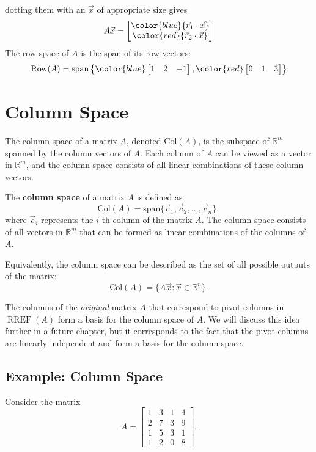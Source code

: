 dotting them with an $\vec{x}$ of appropriate size gives
\[A\vec{x} =
\begin{bmatrix}
\color{blue}{\vec r_1 \cdot \vec{x}} \\
\color{red}{\vec r_2 \cdot \vec{x}}
\end{bmatrix} 
\]
The row space of $A$ is the span of its row vectors:
\[\text{Row}(A)
=
\text{span}\left\{
\color{blue}\begin{bmatrix}1 & 2 & -1\end{bmatrix},
\color{red}\begin{bmatrix}0 & 1 & 3\end{bmatrix}
\right\}
\]


\section{Column Space}
The column space of a matrix $A$, denoted $\text{Col}(A)$, is the subspace of $\mathbb{R}^m$ spanned by the column vectors of $A$. Each column of $A$ can be viewed as a vector in $\mathbb{R}^m$, and the column space consists of all linear combinations of these column vectors.

\begin{mdframed}[frametitle = {Column Space}, style = important]
The \textbf{column space} of a matrix $A$ is defined as
\[
\text{Col}(A) = \text{span}\{\vec c_1, \vec c_2, \ldots, \vec c_n\},
\]
where $\vec c_i$ represents the $i$-th column of the matrix $A$.
The column space consists of all vectors in $\mathbb{R}^m$ that can be formed as linear combinations of the columns of $A$.
\end{mdframed}

Equivalently, the column space can be described as the set of all possible outputs of the matrix:
\[
\text{Col}(A) = \{A\vec{x} : \vec{x} \in \mathbb{R}^n\}.
\]

The columns of the \emph{original} matrix $A$ that correspond to pivot columns in $\operatorname{RREF}(A)$ form a basis for the column space of $A$. We will discuss this idea further in a future chapter, but it corresponds to the fact that the pivot columns are linearly independent and form a basis for the column space.

\subsection{Example: Column Space}

Consider the matrix
\[
A =
\begin{bmatrix}
1 & 3 & 1 & 4 \\
2 & 7 & 3 & 9 \\
1 & 5 & 3 & 1 \\
1 & 2 & 0 & 8
\end{bmatrix}.
\]

